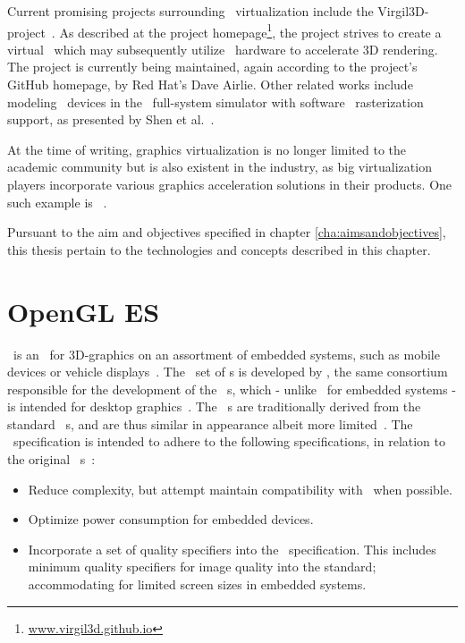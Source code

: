 Current promising projects surrounding \dvttermgpu\ virtualization include the Virgil3D-project~.
As described at the project homepage\footnote{\href{http://virgil3d.github.io/}{www.virgil3d.github.io}}, the project strives to create a virtual \dvttermgpu\ which may subsequently utilize \dvttermhost\ hardware to accelerate 3D rendering.
The project is currently being maintained, again according to the project's GitHub homepage, by Red Hat's Dave Airlie.
Other related works include modeling \dvttermgpu\ devices in the \dvttermqemu\ full-system simulator with software \dvttermopengles\ rasterization support, as presented by Shen et al.~.

At the time of writing, graphics virtualization is no longer limited to the academic community but is also existent in the industry, as big virtualization players incorporate various graphics acceleration solutions in their products.
One such example is \dvttermvmware ~.

Pursuant to the aim and objectives specified in chapter \ref{cha:aimsandobjectives}, this thesis pertain to the technologies and concepts described in this chapter.

\section{OpenGL ES}
\label{sec:backgroundandrelatedwork_opengles}
\dvttermopengles\ is an \dvttermapi\ for 3D-graphics on an assortment of embedded systems, such as mobile devices or vehicle displays~.
The \dvttermopengles\ set of \dvttermapi s is developed by \dvttermkhronos , the same consortium responsible for the development of the \dvttermopengl\ \dvttermapi s, which - unlike \dvttermopengl\ for embedded systems - is intended for desktop graphics~.
The \dvttermopengles\ \dvttermapi s are traditionally derived from the standard \dvttermopengl\ \dvttermapi s, and are thus similar in appearance albeit more limited~.
The \dvttermopengles\ specification is intended to adhere to the following specifications, in relation to the original \dvttermopengl\ \dvttermapi s~:
\begin{itemize}[noitemsep]
	\item Reduce complexity, but attempt maintain compatibility with \dvttermopengl\ when possible.
	\item Optimize power consumption for embedded devices.
	\item Incorporate a set of quality specifiers into the \dvttermopengles\ specification. This includes minimum quality specifiers for image quality into the standard; accommodating for limited screen sizes in embedded systems.
\end{itemize}

